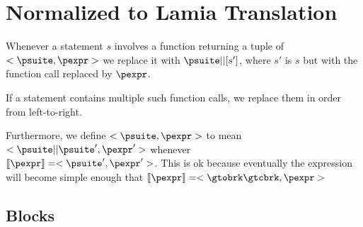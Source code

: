 \documentclass{article}
\begin{document}
\begin{grammar}
{              \gtnot
      \gor    \gtisfunc
      \gor    \gtisint
      \gor    \gtisbool
  }
  \grule[heap]{\oheap}{
              \gtobrc \ovalvariable \mapsto \ovalue, \ldots \gtcbrc
      \cup    \gtobrc \omemvariable \mapsto \omem, \ldots \gtcbrc
      \cup    \gtobrc \omem \mapsto \ovalue, \ldots \gtcbrc
  }
\end{grammar}

\section{Normalized to Lamia Translation}

Whenever a statement $s$ involves a function returning a tuple of $<\psuite, \pexpr>$ we
replace it with $\psuite || [s']$, where $s'$ is $s$ but with the function call replaced by $\pexpr$.

If a statement contains multiple such function calls, we replace them in order from left-to-right.

Furthermore, we define $<\psuite, \pexpr>$ to mean $<\psuite || \psuite', \pexpr'>$ whenever\\
$\meaningof{\pexpr} = <\psuite', \pexpr'>$. This is ok because eventually the expression will become simple
enough that $\meaningof{\pexpr} = <\gtobrk \gtcbrk, \pexpr>$

\subsection{Blocks}

\begin{mathpar}
\end{mathpar}
\end{document}
